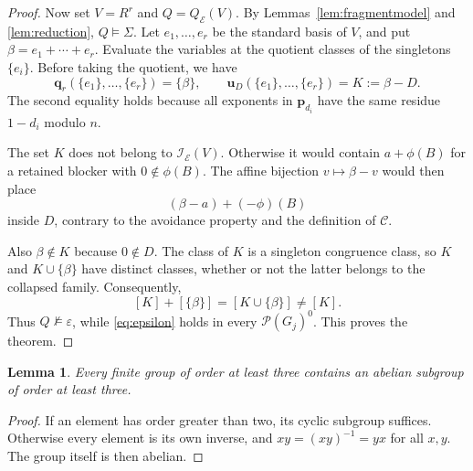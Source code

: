 \documentclass[11pt,reqno]{amsart}
\newtheorem{lemma}[theorem]{Lemma}
\theoremstyle{definition}
\numberwithin{equation}{section}
\newcommand{\Full}[1]{\mathcal{P}(#1)^0}
\newcommand{\bu}{\mathbf{u}}
\newcommand{\bq}{\mathbf{q}}
\newcommand{\bp}{\mathbf{p}}
\newcommand{\calI}{\mathcal{I}}
\newcommand{\calC}{\mathcal{C}}
\newcommand{\calE}{\mathcal{E}}
\begin{document}
\begin{proof}
Now set $V=R^r$ and $Q=Q_{\calE}(V)$. By Lemmas~\ref{lem:fragmentmodel} and \ref{lem:reduction}, $Q\models\Sigma$. Let $e_1,\ldots,e_r$ be the standard basis of $V$, and put $\beta=e_1+\cdots+e_r$. Evaluate the variables at the quotient classes of the singletons $\{e_i\}$. Before taking the quotient, we have
\begin{equation}\label{eq:evaluation}
 \bq_r(\{e_1\},\ldots,\{e_r\})=\{\beta\},\qquad
 \bu_D(\{e_1\},\ldots,\{e_r\})=K:=\beta-D.
\end{equation}
The second equality holds because all exponents in $\bp_{d_i}$ have the same residue $1-d_i$ modulo $n$.

The set $K$ does not belong to $\calI_{\calE}(V)$. Otherwise it would contain $a+\phi(B)$ for a retained blocker with $0\notin\phi(B)$. The affine bijection $v\mapsto\beta-v$ would then place
\[
 (\beta-a)+(-\phi)(B)
\]
inside $D$, contrary to the avoidance property and the definition of $\calC$.

Also $\beta\notin K$ because $0\notin D$. The class of $K$ is a singleton congruence class, so $K$ and $K\cup\{\beta\}$ have distinct classes, whether or not the latter belongs to the collapsed family. Consequently,
\[
 [K]+[\{\beta\}]=[K\cup\{\beta\}]\ne[K].
\]
Thus $Q\not\models\varepsilon$, while \eqref{eq:epsilon} holds in every $\Full{G_j}$. This proves the theorem.
\end{proof}

\begin{lemma}\label{lem:abeliansubgroup}
Every finite group of order at least three contains an abelian subgroup of order at least three.
\end{lemma}
\begin{proof}
If an element has order greater than two, its cyclic subgroup suffices. Otherwise every element is its own inverse, and $xy=(xy)^{-1}=yx$ for all $x,y$. The group itself is then abelian.
\end{proof}
\end{document}
